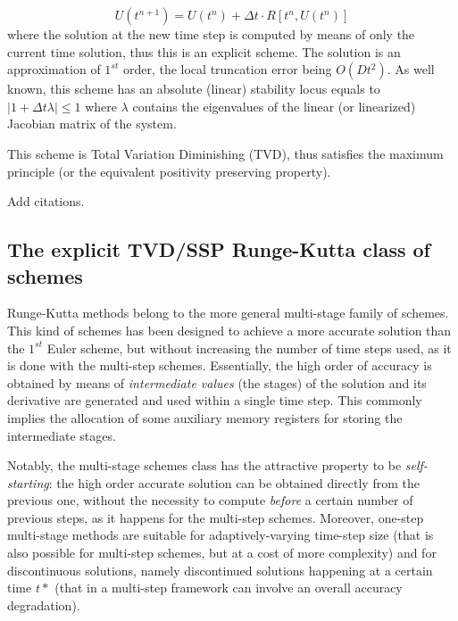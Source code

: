 \documentclass[pdftex,preprint,3p,times,numbers]{elsarticle}
\begin{document}
\begin{equation}
  U\left(t^{n+1}\right) = U\left(t^n\right) +\Delta t \cdot R\left[t^n, U\left(t^n\right)\right]
\label{eq:solver-euler}
\end{equation}
where the solution at the new time step is computed by means of only the current time solution, thus this is an explicit scheme. The solution is an approximation of $1^{st}$ order, the local truncation error being $O(Dt^2)$. As well known, this scheme has an absolute (linear) stability locus equals to $|1+\Delta t \lambda|\le 1$ where $\lambda$ contains the eigenvalues of the linear (or linearized) Jacobian matrix of the system.

This scheme is Total Variation Diminishing (TVD), thus satisfies the maximum principle (or the equivalent positivity preserving property).

{\color{red} Add citations.}

\subsection{The explicit TVD/SSP Runge-Kutta class of schemes}

Runge-Kutta methods belong to the more general multi-stage family of schemes. This kind of schemes has been designed to achieve a more accurate solution than the $1^{st}$ Euler scheme, but without increasing the number of time steps used, as it is done with the multi-step schemes. Essentially, the high order of accuracy is obtained by means of \emph{intermediate values} (the stages) of the solution and its derivative are generated and used within a single time step. This commonly implies the allocation of some auxiliary memory registers for storing the intermediate stages.

Notably, the multi-stage schemes class has the attractive property to be \emph{self-starting}: the high order accurate solution can be obtained directly from the previous one, without the necessity to compute \emph{before} a certain number of previous steps, as it happens for the multi-step schemes. Moreover, one-step multi-stage methods are suitable for adaptively-varying time-step size (that is also possible for multi-step schemes, but at a cost of more complexity) and for discontinuous solutions, namely discontinued solutions happening at a certain time $t*$ (that in a multi-step framework can involve an overall accuracy degradation).
\end{document}
